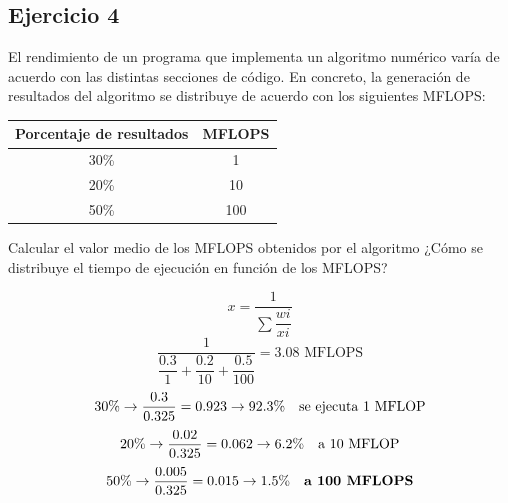 \subsection{Ejercicio 4}
\noindent
El rendimiento de un programa que implementa un algoritmo numérico varía de acuerdo con las distintas secciones de código. En concreto, la generación de resultados del algoritmo se distribuye de acuerdo con los siguientes MFLOPS:
\begin{table}[H]
\centering
\begin{tabular}{|c|c|}
\hline
\textbf{Porcentaje de resultados} & \textbf{MFLOPS} \\ \hline
30\%                              & 1               \\ \hline
20\%                              & 10              \\ \hline
50\%                              & 100             \\ \hline
\end{tabular}
\end{table}
\noindent
Calcular el valor medio de los MFLOPS obtenidos por el algoritmo ¿Cómo se distribuye el tiempo de ejecución en función de los MFLOPS?
\begin{tcolorbox}[colback=white,colframe=cyan!50!black,fonttitle=\bfseries]
\[
x=\dfrac{1}{\sum\dfrac{wi}{xi}}
\]
\[
\dfrac{1}{\dfrac{0.3}{1}+\dfrac{0.2}{10}+\dfrac{0.5}{100}}=3.08\text{ MFLOPS}
\]
\[
30\%\rightarrow\dfrac{0.3}{0.325}=0.923\rightarrow 92.3\%\quad\text{se ejecuta 1 MFLOP}
\]
\[
20\%\rightarrow\dfrac{0.02}{0.325}=0.062\rightarrow 6.2\%\quad\text{a 10 MFLOP}
\]
\[
50\%\rightarrow\dfrac{0.005}{0.325}=0.015\rightarrow 1.5\%\quad\textbf{a 100 MFLOPS}
\]
\end{tcolorbox}

